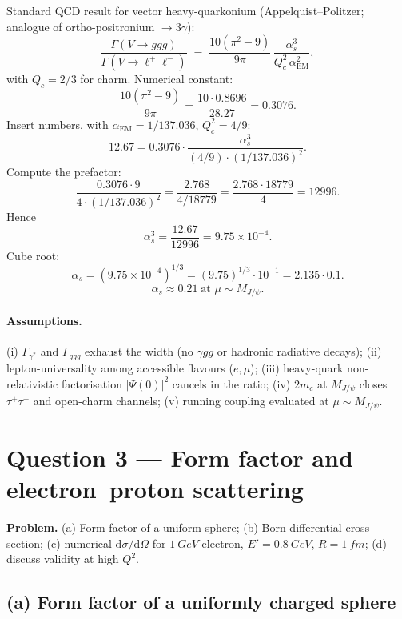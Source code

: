 \documentclass[11pt]{article}
\newcommand{\de}{\mathrm{d}}
\begin{document}
Standard QCD result for vector heavy-quarkonium (Appelquist--Politzer; analogue of ortho-positronium $\to 3\gamma$):
\[
\frac{\Gamma(V\to ggg)}{\Gamma(V\to \ell^+\ell^-)} \;=\; \frac{10(\pi^2-9)}{9\pi}\,\frac{\alpha_s^3}{Q_c^2\,\alpha_\text{EM}^2},
\]
with $Q_c=2/3$ for charm. Numerical constant:
\[
\frac{10(\pi^2-9)}{9\pi} = \frac{10\cdot 0.8696}{28.27} = 0.3076.
\]
Insert numbers, with $\alpha_\text{EM}=1/137.036$, $Q_c^2=4/9$:
\[
12.67 = 0.3076\cdot\frac{\alpha_s^3}{(4/9)\cdot(1/137.036)^2}.
\]
Compute the prefactor:
\[
\frac{0.3076\cdot 9}{4\cdot(1/137.036)^2} = \frac{2.768}{4/18779} = \frac{2.768\cdot 18779}{4} = 12996.
\]
Hence
\[
\alpha_s^3 = \frac{12.67}{12996} = 9.75\times 10^{-4}.
\]
Cube root:
\[
\alpha_s = (9.75\times 10^{-4})^{1/3} = (9.75)^{1/3}\cdot 10^{-1} = 2.135\cdot 0.1.
\]
\[
\boxed{\;\alpha_s \approx 0.21\;\text{at }\mu\sim M_{J/\psi}.\;}
\]

\paragraph{Assumptions.} (i) $\Gamma_{\gamma^*}$ and $\Gamma_{ggg}$ exhaust the width (no $\gamma gg$ or hadronic radiative decays); (ii) lepton-universality among accessible flavours ($e,\mu$); (iii) heavy-quark non-relativistic factorisation $|\Psi(0)|^2$ cancels in the ratio; (iv) $2m_c$ at $M_{J/\psi}$ closes $\tau^+\tau^-$ and open-charm channels; (v) running coupling evaluated at $\mu\sim M_{J/\psi}$.

\section*{Question 3 --- Form factor and electron--proton scattering}

\textbf{Problem.} (a) Form factor of a uniform sphere; (b) Born differential cross-section; (c) numerical $\de\sigma/\de\Omega$ for $\SI{1}{GeV}$ electron, $E'=\SI{0.8}{GeV}$, $R=\SI{1}{fm}$; (d) discuss validity at high $Q^2$.

\subsection*{(a) Form factor of a uniformly charged sphere}
\end{document}
